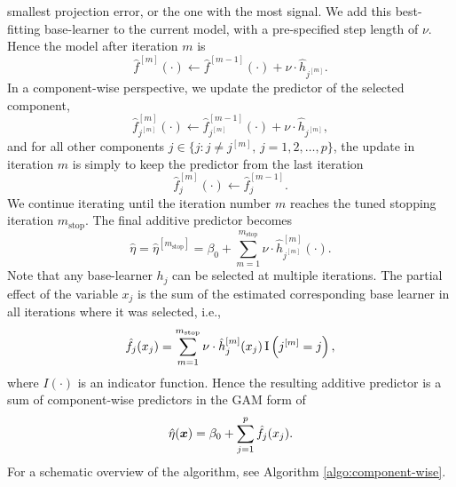 smallest projection error, or the one with the most signal.
We add this best-fitting base-learner to the current model, with a pre-specified step length of $\nu$. Hence the model after iteration $m$ is
\begin{equation}
    \hat{f}^{[m]}(\cdot)\gets \hat{f}^{[m-1]}(\cdot)+\nu\cdot\hat{h}_{j^{[m]}}.
\end{equation}
In a component-wise perspective, we update the predictor of the selected component,
\begin{equation}
    \hat{f}_{j^{[m]}}^{[m]}(\cdot)\gets \hat{f}_{j^{[m]}}^{[m-1]}(\cdot)+\nu\cdot\hat{h}_{j^{[m]}},
\end{equation}
and for all other components $j\in\{j\colon j\neq j^{[m]},\,j=1,2,\ldots,p\}$, the update in iteration $m$ is simply
to keep the predictor from the last iteration
\begin{equation}
    \hat{f}_{j}^{[m]}(\cdot)\gets \hat{f}_{j}^{[m-1]}.
\end{equation}
We continue iterating until the iteration number $m$ reaches the tuned stopping iteration $m_{\text{stop}}$.
The final additive predictor becomes
\begin{equation}
    \hat{\eta}=\hat{\eta}^{[m_{\text{stop}}]}=\beta_0 + \sum_{m=1}^{m_{\text{stop}}}\nu\cdot\hat{h}_{j^{[m]}}^{[m]}(\cdot).
\end{equation}
Note that any base-learner $h_j$ can be selected at multiple iterations. The partial effect of the variable $x_j$ is the sum of the estimated corresponding base learner in all iterations where it was selected, i.e.,
\begin{equation*}
    \hat{f}_j(x_j)=\sum_{m=1}^{m_{\text{stop}}}\nu\cdot\hat{h}_j^{[m]}(x_j)\operatorname{I}\left(j^{[m]}=j\right),
\end{equation*}
where $I(\cdot)$ is an indicator function. Hence the resulting additive predictor is a sum of component-wise predictors in the GAM form of
\begin{equation}
    \hat{\eta}(\bm{x})=\beta_0+\sum_{j=1}^p \hat{f}_j(x_j).
\end{equation}
For a schematic overview of the algorithm, see Algorithm \ref{algo:component-wise}.
